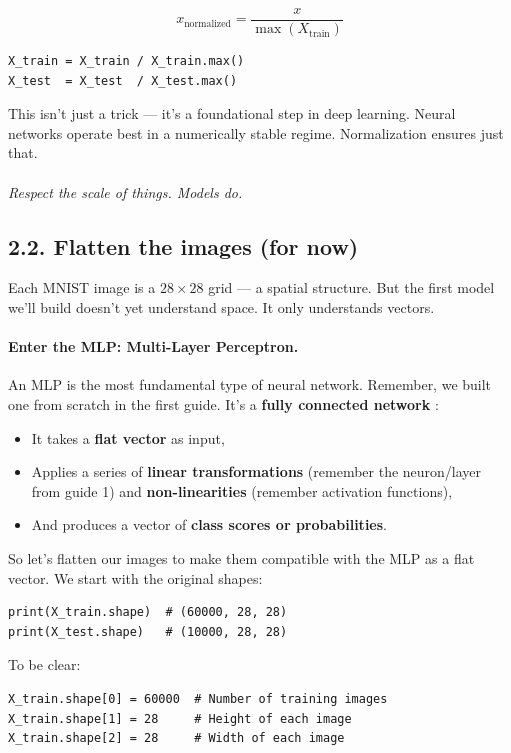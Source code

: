\documentclass[11pt]{article}
\begin{document}
\[
x_{\text{normalized}} = \frac{x}{\max(X_{\text{train}})}
\]

\begin{verbatim}
X_train = X_train / X_train.max()
X_test  = X_test  / X_test.max()
\end{verbatim}

This isn’t just a trick — it’s a foundational step in deep learning.  
Neural networks operate best in a numerically stable regime. Normalization ensures just that.

\paragraph{} \textit{Respect the scale of things. Models do.}

\subsection*{2.2. Flatten the images (for now)}

Each MNIST image is a $28 \times 28$ grid — a spatial structure. But the first model we’ll build doesn’t yet understand space. It only understands vectors.

\paragraph{Enter the MLP: Multi-Layer Perceptron.}

An MLP is the most fundamental type of neural network. Remember, we built one from scratch in the first guide. It’s a \textbf{fully connected network} :
\begin{itemize}
    \item It takes a \textbf{flat vector} as input,
    \item Applies a series of \textbf{linear transformations} (remember the neuron/layer from guide 1) and \textbf{non-linearities} (remember activation functions),
    \item And produces a vector of \textbf{class scores or probabilities}.
\end{itemize}

\noindent So let's flatten our images to make them compatible with the MLP as a flat vector.
We start with the original shapes:
\begin{verbatim}
print(X_train.shape)  # (60000, 28, 28)
print(X_test.shape)   # (10000, 28, 28)
\end{verbatim}

To be clear:
\begin{verbatim}
X_train.shape[0] = 60000  # Number of training images
X_train.shape[1] = 28     # Height of each image
X_train.shape[2] = 28     # Width of each image
\end{verbatim}
\end{document}
